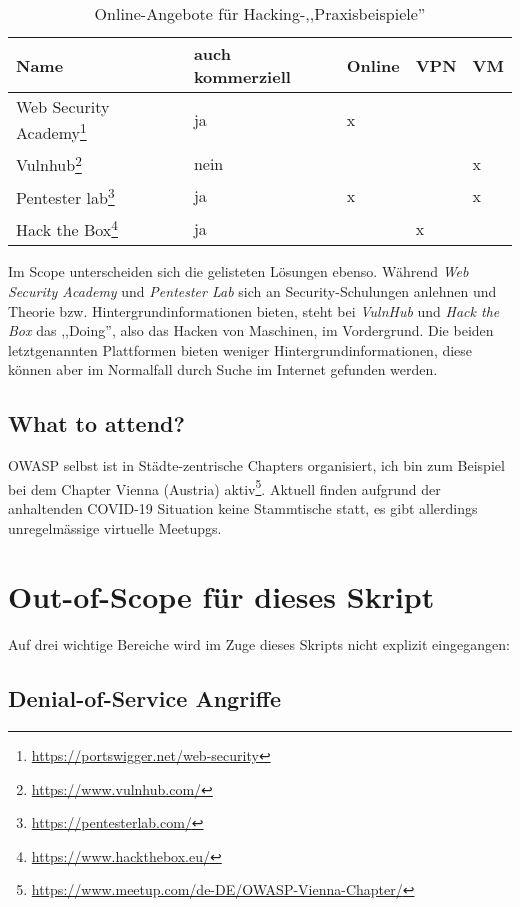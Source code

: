 \begin{table}
	\begin{center}
\begin{tabular}{lllll}
	\toprule
	Name & auch kommerziell & Online & VPN & VM \\
	\midrule
	Web Security Academy\footnote{\url{https://portswigger.net/web-security}}  & ja   & x &   &   \\
	Vulnhub\footnote{\url{https://www.vulnhub.com/}}              & nein &   &   & x \\
	Pentester lab\footnote{\url{https://pentesterlab.com/}}        & ja   & x &   & x \\
	Hack the Box\footnote{\url{https://www.hackthebox.eu/}}         & ja   & ~ & x &   \\
	\bottomrule
\end{tabular}
\end{center}
	\caption{Online-Angebote für Hacking-,,Praxisbeispiele''}
	\label{tbl:online_hacking}
\end{table}

Im Scope unterscheiden sich die gelisteten Lösungen ebenso. Während \textit{Web Security Academy} und \textit{Pentester Lab} sich an Security-Schulungen anlehnen und Theorie bzw. Hintergrundinformationen bieten, steht bei \textit{VulnHub} und \textit{Hack the Box} das ,,Doing'', also das Hacken von Maschinen, im Vordergrund. Die beiden letztgenannten Plattformen bieten weniger Hintergrundinformationen, diese können aber im Normalfall durch Suche im Internet gefunden werden.

\subsection{What to attend?}

OWASP selbst ist in Städte-zentrische Chapters organisiert, ich bin zum Beispiel bei dem Chapter Vienna (Austria) aktiv\footnote{\url{https://www.meetup.com/de-DE/OWASP-Vienna-Chapter/}}. Aktuell finden aufgrund der anhaltenden COVID-19 Situation keine Stammtische statt, es gibt allerdings unregelmässige virtuelle Meetupgs.

\section{Out-of-Scope für dieses Skript}

Auf drei wichtige Bereiche wird im Zuge dieses Skripts nicht explizit eingegangen:

\subsection{Denial-of-Service Angriffe}

